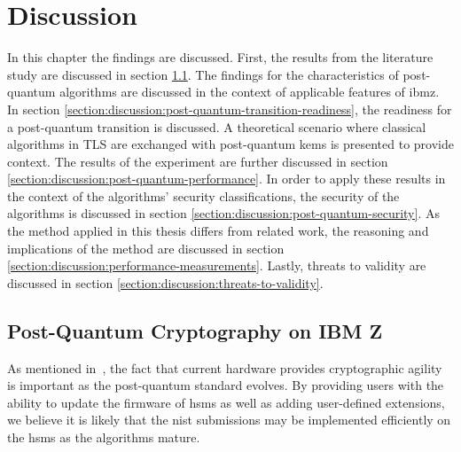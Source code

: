 \chapter{Discussion}
\label{chapter:discussion}

In this chapter the findings are discussed. First, the results from the literature study are discussed in section \ref{section:discussion:post-quantum-on-ibm-z}. The findings for the characteristics of \gls{post-quantum} algorithms are discussed in the context of applicable features of \gls{ibmz}. In section \ref{section:discussion:post-quantum-transition-readiness}, the readiness for a \gls{post-quantum} transition is discussed. A theoretical scenario where classical algorithms in TLS are exchanged with \gls{post-quantum} \glspl{kem} is presented to provide context. The results of the experiment are further discussed in section \ref{section:discussion:post-quantum-performance}. In order to apply these results in the context of the algorithms' security classifications, the security of the algorithms is discussed in section \ref{section:discussion:post-quantum-security}. As the method applied in this thesis differs from related work, the reasoning and implications of the method are discussed in section \ref{section:discussion:performance-measurements}. Lastly, threats to validity are discussed in section \ref{section:discussion:threats-to-validity}.

\section{Post-Quantum Cryptography on IBM Z}
\label{section:discussion:post-quantum-on-ibm-z}

As mentioned in~\cite{microsoft2020, ibm:z15:2019}, the fact that current hardware provides cryptographic agility is important as the \gls{post-quantum} standard evolves. By providing users with the ability to update the firmware of \glspl{hsm} as well as adding user-defined extensions, we believe it is likely that the \gls{nist} submissions may be implemented efficiently on the \glspl{hsm} as the algorithms mature.

